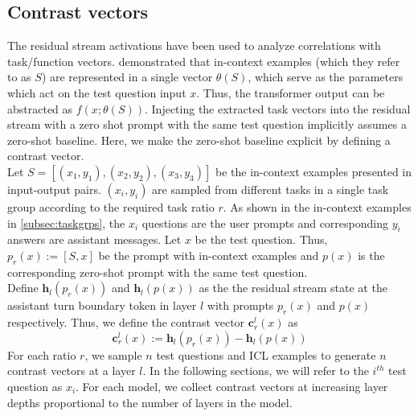 \documentclass[11pt]{article}
\begin{document}
\subsection{Contrast vectors}
The residual stream activations have been used to analyze correlations with task/function vectors. \citet{Hendel2023-yk} demonstrated that in-context examples (which they refer to as \(S\)) are represented in a single vector \(\theta(S)\), which serve as the parameters which act on the test question input \(x\). Thus, the transformer output can be abstracted as \(f(x; \theta(S))\). Injecting the extracted task vectors into the residual stream with a zero shot prompt with the same test question implicitly assumes a zero-shot baseline. Here, we make the zero-shot baseline explicit by defining a contrast vector. \\[1em]
Let \(S = [(x_1, y_1), (x_2, y_2), (x_3, y_3)]\) be the in-context examples presented in input-output pairs. \((x_i, y_i)\) are sampled from different tasks in a single task group according to the required task ratio \(r\). As shown in the in-context examples in \ref{subsec:taskgrps}, the \(x_i\) questions are the user prompts and corresponding \(y_i\) answers are assistant messages. Let \(x\) be the test question. Thus, \(p_r(x) := [S, x]\) be the prompt with in-context examples and \(p(x)\) is the corresponding zero-shot prompt with the same test question. \\[1em]
Define \(\textbf{h}_l(p_r(x))\) and \(\textbf{h}_l(p(x))\) as the the residual stream state at the assistant turn boundary token in layer \(l\) with prompts \(p_{r}(x)\) and \(p(x)\) respectively. Thus, we define the contrast vector \(\textbf{c}_r^l(x)\) as
$$
    \textbf{c}_r^l(x) := \textbf{h}_l(p_r(x)) - \textbf{h}_l(p(x))
$$
For each ratio \(r\), we sample \(n\) test questions and ICL examples to generate \(n\) contrast vectors at a layer \(l\). In the following sections, we will refer to the \(i^{th}\) test question as \(x_i\). For each model, we collect contrast vectors at increasing layer depths proportional to the number of layers in the model.
\end{document}
